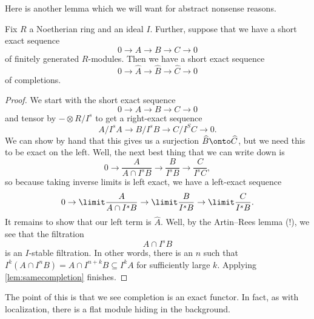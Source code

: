Here is another lemma which we will want for abstract nonsense reasons.
\begin{lemma}
	Fix $R$ a Noetherian ring and an ideal $I$. Further, suppose that we have a short exact sequence
	\[0\to A\to B\to C\to 0\]
	of finitely generated $R$-modules. Then we have a short exact sequence
	\[0\to\widehat A\to\widehat B\to\widehat C\to0\]
	of completions.
\end{lemma}
\begin{proof}
	We start with the short exact sequence
	\[0\to A\to B\to C\to 0\]
	and tensor by $-\otimes R/I^s$ to get a right-exact sequence
	\[A/I^sA\to B/I^sB\to C/I^SC\to0.\]
	We can show by hand that this gives us a surjection $\widehat B\onto\widehat C$, but we need this to be exact on the left. Well, the next best thing that we can write down is
	\[0\to\frac A{A\cap I^sB}\to\frac B{I^sB}\to\frac C{I^sC},\]
	so because taking inverse limits is left exact, we have a left-exact sequence
	\[0\to\limit\frac A{A\cap I^sB}\to\limit\frac B{I^sB}\to\limit\frac C{I^sB}.\]
	It remains to show that our left term is $\widehat A$. Well, by the Artin--Rees lemma (!), we see that the filtration
	\[A\cap I^sB\]
	is an $I$-stable filtration. In other words, there is an $n$ such that $I^k(A\cap I^nB)=A\cap I^{n+k}B\subseteq I^kA$ for sufficiently large $k$. Applying \autoref{lem:samecompletion} finishes.
\end{proof}
The point of this is that we see completion is an exact functor. In fact, as with localization, there is a flat module hiding in the background.
\completetensor*
